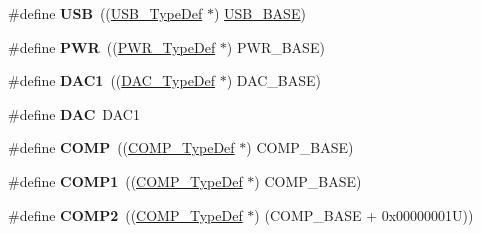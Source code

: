 \begin{DoxyCompactItemize}
\item 
\hypertarget{group___peripheral__declaration_ga779bf099075a999d1074357fccbd466b}{\#define {\bfseries U\-S\-B}~((\hyperlink{struct_u_s_b___type_def}{U\-S\-B\-\_\-\-Type\-Def} $\ast$) \hyperlink{group___peripheral__memory__map_gaa6c4cbed4ddbb3ecd77de93fab2a2e04}{U\-S\-B\-\_\-\-B\-A\-S\-E})}\label{group___peripheral__declaration_ga779bf099075a999d1074357fccbd466b}

\item 
\hypertarget{group___peripheral__declaration_ga04651c526497822a859942b928e57f8e}{\#define {\bfseries P\-W\-R}~((\hyperlink{struct_p_w_r___type_def}{P\-W\-R\-\_\-\-Type\-Def} $\ast$) P\-W\-R\-\_\-\-B\-A\-S\-E)}\label{group___peripheral__declaration_ga04651c526497822a859942b928e57f8e}

\item 
\hypertarget{group___peripheral__declaration_gaffb5ff8779fa698f3c7165a617d56e4f}{\#define {\bfseries D\-A\-C1}~((\hyperlink{struct_d_a_c___type_def}{D\-A\-C\-\_\-\-Type\-Def} $\ast$) D\-A\-C\-\_\-\-B\-A\-S\-E)}\label{group___peripheral__declaration_gaffb5ff8779fa698f3c7165a617d56e4f}

\item 
\hypertarget{group___peripheral__declaration_ga4aa2a4ab86ce00c23035e5cee2e7fc7e}{\#define {\bfseries D\-A\-C}~D\-A\-C1}\label{group___peripheral__declaration_ga4aa2a4ab86ce00c23035e5cee2e7fc7e}

\item 
\hypertarget{group___peripheral__declaration_ga076912543697dbe4c46b79e8e44ad2fb}{\#define {\bfseries C\-O\-M\-P}~((\hyperlink{struct_c_o_m_p___type_def}{C\-O\-M\-P\-\_\-\-Type\-Def} $\ast$) C\-O\-M\-P\-\_\-\-B\-A\-S\-E)}\label{group___peripheral__declaration_ga076912543697dbe4c46b79e8e44ad2fb}

\item 
\hypertarget{group___peripheral__declaration_gaf5713f83009027d48805b049d55bb01b}{\#define {\bfseries C\-O\-M\-P1}~((\hyperlink{struct_c_o_m_p___type_def}{C\-O\-M\-P\-\_\-\-Type\-Def} $\ast$) C\-O\-M\-P\-\_\-\-B\-A\-S\-E)}\label{group___peripheral__declaration_gaf5713f83009027d48805b049d55bb01b}

\item 
\hypertarget{group___peripheral__declaration_ga6985fa7e9bb3c2edf15b29b7af210a2b}{\#define {\bfseries C\-O\-M\-P2}~((\hyperlink{struct_c_o_m_p___type_def}{C\-O\-M\-P\-\_\-\-Type\-Def} $\ast$) (C\-O\-M\-P\-\_\-\-B\-A\-S\-E + 0x00000001\-U))}\label{group___peripheral__declaration_ga6985fa7e9bb3c2edf15b29b7af210a2b}


\end{DoxyCompactItemize}
